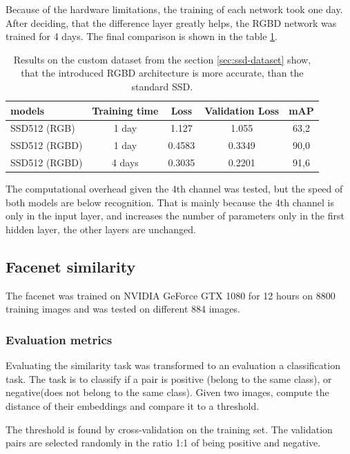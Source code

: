 \documentclass[a4paper,11pt,titlepage,twoside]{article}
\numberwithin{figure}{section}
\begin{document}
Because of the hardware limitations, the training of each network took one day. After deciding, that the difference layer greatly helps, the RGBD network was trained for 4 days. The final comparison is shown in the table \ref{tab:ssd_camparison}.

\begin{table}
\centering
\begin{tabular}{|l|c|c|c|c|}
  \hline
  models & Training time & Loss & Validation Loss & mAP \\
  \hline
  SSD512 (RGB) & 1 day & 1.127 & 1.055 & 63,2 \\
  \hline
  SSD512 (RGBD) & 1 day & 0.4583 & 0.3349 & 90,0 \\
  \hline
  SSD512 (RGBD) & 4 days & 0.3035 & 0.2201 & 91,6 \\
  \hline
\end{tabular}
\caption{Results on the custom dataset from the section \ref{sec:ssd-dataset} show, that the introduced RGBD architecture is more accurate, than the standard SSD.}
\label{tab:ssd_camparison}
\end{table}

The computational overhead given the 4th channel was tested, but the speed of both models are below recognition. That is mainly because the 4th channel is only in the input layer, and increases the number of parameters only in the first hidden layer, the other layers are unchanged.

\subsection{Facenet similarity}
The facenet was trained on NVIDIA GeForce GTX 1080 for 12 hours on 8800 training images and was tested on different 884 images. 

\subsubsection{Evaluation metrics}
\label{sec:similarity-eval}
Evaluating the similarity task was transformed to an evaluation a classification task. The task is to classify if a pair is positive (belong to the same class), or negative(does not belong to the same class). Given two images, compute the distance of their embeddings and compare it to a threshold. 

The threshold is found by cross-validation on the training set. The validation pairs are selected randomly in the ratio 1:1 of being positive and negative.
\end{document}
